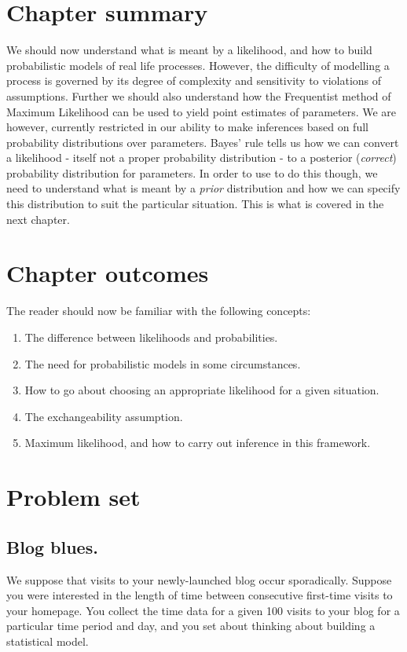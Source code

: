 \documentclass[11pt,fullpage]{book}
\begin{document}
\section{Chapter summary}
We should now understand what is meant by a likelihood, and how to build probabilistic models of real life processes. However, the difficulty of modelling a process is governed by its degree of complexity and sensitivity to violations of assumptions. Further we should also understand how the Frequentist method of Maximum Likelihood can be used to yield point estimates of parameters. We are however, currently restricted in our ability to make inferences based on full probability distributions over parameters. Bayes' rule tells us how we can convert a likelihood - itself not a proper probability distribution - to a posterior (\textit{correct}) probability distribution for parameters. In order to use to do this though, we need to understand what is meant by a \textit{prior} distribution and how we can specify this distribution to suit the particular situation. This is what is covered in the next chapter.

\section{Chapter outcomes}
The reader should now be familiar with the following concepts:

\begin{enumerate}
\item The difference between likelihoods and probabilities.
\item The need for probabilistic models in some circumstances.
\item How to go about choosing an appropriate likelihood for a given situation.
\item The exchangeability assumption.
\item Maximum likelihood, and how to carry out inference in this framework.
\end{enumerate}

\section{Problem set}
\subsection{Blog blues.}
We suppose that visits to your newly-launched blog occur sporadically. Suppose you were interested in the length of time between consecutive first-time visits to your homepage. You collect the time data for a given 100 visits to your blog for a particular time period and day, and you set about thinking about building a statistical model.
\end{document}
